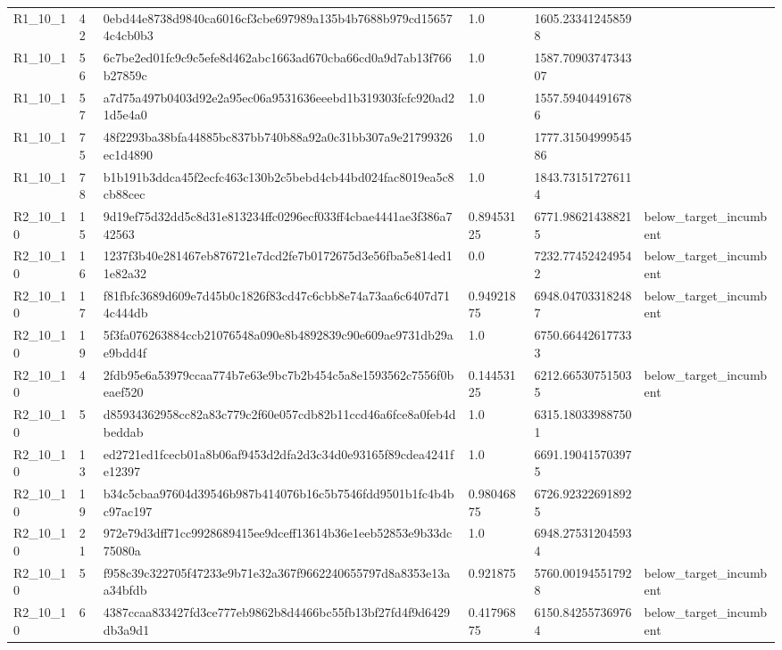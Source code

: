\begin{tabular}{llllll}
 R1\_10\_1 & 42 & 0ebd44e8738d9840ca6016cf3cbe697989a135b4b7688b979cd156574c4cb0b3 & 1.0 & 1605.233412458598 &  \\
 R1\_10\_1 & 56 & 6c7be2ed01fc9c9c5efe8d462abc1663ad670cba66cd0a9d7ab13f766b27859c & 1.0 & 1587.7090374734307 &  \\
 R1\_10\_1 & 57 & a7d75a497b0403d92e2a95ec06a9531636eeebd1b319303fcfc920ad21d5e4a0 & 1.0 & 1557.594044916786 &  \\
 R1\_10\_1 & 75 & 48f2293ba38bfa44885bc837bb740b88a92a0c31bb307a9e21799326ec1d4890 & 1.0 & 1777.3150499954586 &  \\
 R1\_10\_1 & 78 & b1b191b3ddca45f2ecfc463c130b2c5bebd4cb44bd024fac8019ea5c8cb88cec & 1.0 & 1843.731517276114 &  \\
 R2\_10\_10 & 15 & 9d19ef75d32dd5c8d31e813234ffc0296ecf033ff4cbae4441ae3f386a742563 & 0.89453125 & 6771.986214388215 & below\_target\_incumbent \\
 R2\_10\_10 & 16 & 1237f3b40e281467eb876721e7dcd2fe7b0172675d3e56fba5e814ed11e82a32 & 0.0 & 7232.774524249542 & below\_target\_incumbent \\
 R2\_10\_10 & 17 & f81fbfc3689d609e7d45b0c1826f83cd47c6cbb8e74a73aa6c6407d714c444db & 0.94921875 & 6948.047033182487 & below\_target\_incumbent \\
 R2\_10\_10 & 19 & 5f3fa076263884ccb21076548a090e8b4892839c90e609ae9731db29ae9bdd4f & 1.0 & 6750.664426177333 &  \\
 R2\_10\_10 & 4 & 2fdb95e6a53979ccaa774b7e63e9bc7b2b454c5a8e1593562c7556f0beaef520 & 0.14453125 & 6212.665307515035 & below\_target\_incumbent \\
 R2\_10\_10 & 5 & d85934362958cc82a83c779c2f60e057cdb82b11ccd46a6fce8a0feb4dbeddab & 1.0 & 6315.180339887501 &  \\
 R2\_10\_10 & 13 & ed2721ed1fcecb01a8b06af9453d2dfa2d3c34d0e93165f89cdea4241fe12397 & 1.0 & 6691.190415703975 &  \\
 R2\_10\_10 & 19 & b34c5cbaa97604d39546b987b414076b16c5b7546fdd9501b1fc4b4bc97ac197 & 0.98046875 & 6726.923226918925 &  \\
 R2\_10\_10 & 21 & 972e79d3dff71cc9928689415ee9dceff13614b36e1eeb52853e9b33dc75080a & 1.0 & 6948.275312045934 &  \\
 R2\_10\_10 & 5 & f958c39c322705f47233e9b71e32a367f9662240655797d8a8353e13aa34bfdb & 0.921875 & 5760.001945517928 & below\_target\_incumbent \\
 R2\_10\_10 & 6 & 4387ccaa833427fd3ce777eb9862b8d4466bc55fb13bf27fd4f9d6429db3a9d1 & 0.41796875 & 6150.842557369764 & below\_target\_incumbent \\

\end{tabular}
